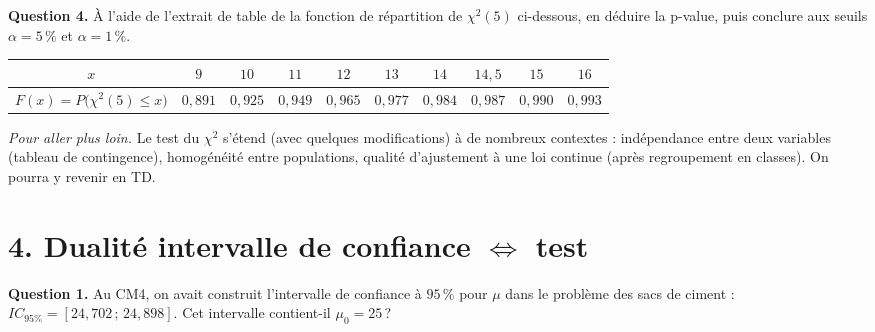 \textbf{Question 4.} À l'aide de l'extrait de table de la fonction de répartition de $\chi^2(5)$ ci-dessous, en déduire la p-value, puis conclure aux seuils $\alpha = 5\,\%$ et $\alpha = 1\,\%$.

\begin{center}
\renewcommand{\arraystretch}{1.3}
\small
\begin{tabular}{|c|c|c|c|c|c|c|c|c|c|}
  \hline
  $x$ & $9$ & $10$ & $11$ & $12$ & $13$ & $14$ & $14{,}5$ & $15$ & $16$ \\
  \hline
  $F(x) = P\!\bigl(\chi^2(5) \le x\bigr)$ & $0{,}891$ & $0{,}925$ & $0{,}949$ & $0{,}965$ & $0{,}977$ & $0{,}984$ & $0{,}987$ & $0{,}990$ & $0{,}993$ \\
  \hline
\end{tabular}
\end{center}


\medskip

\textit{Pour aller plus loin.} Le test du $\chi^2$ s'étend (avec quelques modifications) à de nombreux contextes : indépendance entre deux variables (tableau de contingence), homogénéité entre populations, qualité d'ajustement à une loi continue (après regroupement en classes). On pourra y revenir en TD.

\section*{4. Dualité intervalle de confiance $\Longleftrightarrow$ test}

\textbf{Question 1.} Au CM4, on avait construit l'intervalle de confiance à $95\,\%$ pour $\mu$ dans le problème des sacs de ciment : $IC_{95\%} = [24{,}702\,;\,24{,}898]$. Cet intervalle contient-il $\mu_0 = 25$\,?

